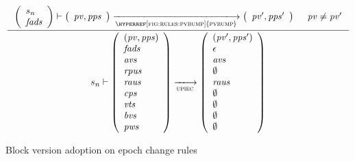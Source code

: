 \begin{figure}[htb]
\begin{equation}
    \inference
    {
      {\left(\begin{array}{l}
         s_n\\
         \var{fads}
       \end{array}\right)}
      \vdash
      {
        \left(
          \begin{array}{l}
            \var{pv}, \var{pps}\\
          \end{array}
        \right)
      }
      \trans{\hyperref[fig:rules:pvbump]{pvbump}}{}
      {
        \left(
          \begin{array}{l}
            \var{pv'}, \var{pps'}\\
          \end{array}
        \right)
      }
      & \var{pv} \neq \var{pv'}
    }
    {
      s_n
      \vdash
      {
        \left(
          \begin{array}{l}
            \var{(\var{pv}, \var{pps})}\\
            \var{fads}\\
            \var{avs}\\
            \var{rpus}\\
            \var{raus}\\
            \var{cps}\\
            \var{vts}\\
            \var{bvs}\\
            \var{pws}
          \end{array}
        \right)
      }
      \trans{upiec}{}
      {
        \left(
          \begin{array}{l}
            (\var{pv'}, \var{pps'})\\
            \epsilon\\
            \var{avs}\\
            \emptyset\\
            \var{raus}\\
            \emptyset\\
            \emptyset\\
            \emptyset\\
            \emptyset\\
          \end{array}
        \right)
      }
    }
  \end{equation}
  \caption{Block version adoption on epoch change rules}
  \label{fig:rules:upi-ec}
\end{figure}

